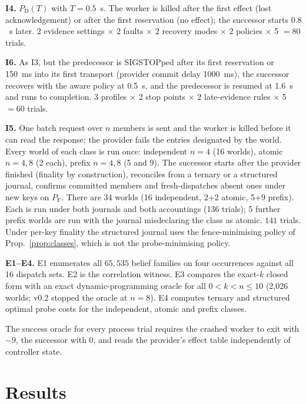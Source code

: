 \documentclass[conference,10pt]{IEEEtran}
\newcommand{\PDT}{P_{\mathrm{D}}(T)}
\newcommand{\PF}{P_{\mathrm{F}}}
\begin{document}
\textbf{I4.} $\PDT$ with $T=0.5$~s. The worker is killed after the first effect (lost acknowledgement) or after the first reservation (no effect); the successor starts $0.8$~s later. $2$ evidence settings $\times$ $2$ faults $\times$ $2$ recovery modes $\times$ $2$ policies $\times$ 5 $=80$ trials.

\textbf{I6.} As I3, but the predecessor is SIGSTOPped after its first reservation or 150~ms into its first transport (provider commit delay 1000~ms), the successor recovers with the aware policy at 0.5~s, and the predecessor is resumed at 1.6~s and runs to completion. $3$ profiles $\times$ $2$ stop points $\times$ $2$ late-evidence rules $\times$ 5 $=60$ trials.

\textbf{I5.} One batch request over $n$ members is sent and the worker is killed before it can read the response; the provider fails the entries designated by the world. Every world of each class is run once: independent $n{=}4$ (16 worlds), atomic $n{=}4,8$ (2 each), prefix $n{=}4,8$ (5 and 9). The successor starts after the provider finished (finality by construction), reconciles from a ternary or a structured journal, confirms committed members and fresh-dispatches absent ones under new keys on $\PF$. There are 34 worlds (16 independent, 2+2 atomic, 5+9 prefix). Each is run under both journals and both accountings (136 trials); 5 further prefix worlds are run with the journal misdeclaring the class as atomic. $141$ trials. Under per-key finality the structured journal uses the fence-minimising policy of Prop.~\ref{prop:classes}, which is not the probe-minimising policy.

\textbf{E1--E4.} E1 enumerates all $65{,}535$ belief families on four occurrences against all 16 dispatch sets. E2 is the correlation witness. E3 compares the exact-$k$ closed form with an exact dynamic-programming oracle for all $0<k<n\le 10$ (2{,}026 worlds; v0.2 stopped the oracle at $n=8$). E4 computes ternary and structured optimal probe costs for the independent, atomic and prefix classes.

The success oracle for every process trial requires the crashed worker to exit with $-9$, the successor with $0$, and reads the provider's effect table independently of controller state.

\section{Results}
\end{document}
